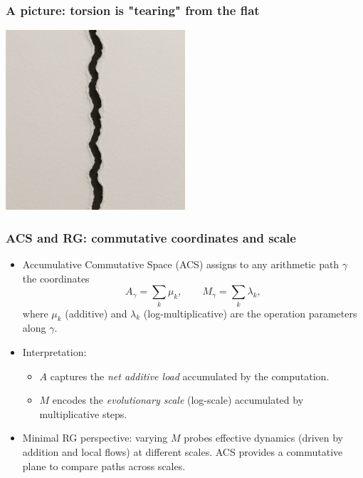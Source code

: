 \documentclass[aspectratio=169]{beamer}
\begin{document}
\begin{frame}
    \frametitle{A picture: torsion is "tearing" from the flat}
    \begin{center}
        \includegraphics[width=0.5\textwidth]{../images/tearing-paper}
    \end{center}
\end{frame}

\begin{frame}
    \frametitle{ACS and RG: commutative coordinates and scale}
    \begin{itemize}
        \item Accumulative Commutative Space (ACS) assigns to any arithmetic path $\gamma$ the coordinates
        \[
            A_\gamma = \sum_k \mu_k,\qquad M_\gamma = \sum_k \lambda_k,
        \]
        where $\mu_k$ (additive) and $\lambda_k$ (log-multiplicative) are the operation parameters along $\gamma$.
        \item Interpretation:
        \begin{itemize}
            \item $A$ captures the \emph{net additive load} accumulated by the computation.
            \item $M$ encodes the \emph{evolutionary scale} (log-scale) accumulated by multiplicative steps.
        \end{itemize}
        \item Minimal RG perspective: varying $M$ probes effective dynamics (driven by addition and local flows) at different scales. ACS provides a commutative plane to compare paths across scales.
    \end{itemize}
\end{frame}
\end{document}
